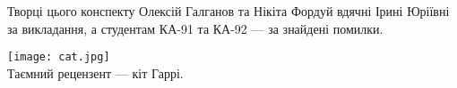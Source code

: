 \newpage
\thispagestyle{empty}
{\LARGE Творці цього конспекту Олексій Галганов та Нікіта Фордуй вдячні Ірині Юріївні за викладання,
а студентам КА-91 та КА-92 --- за знайдені помилки.}
\begin{center}
    \texttt{[image: cat.jpg]}
    \\
    \vspace{3mm}
    {\LARGE Таємний рецензент --- кіт Гаррі.}
\end{center}